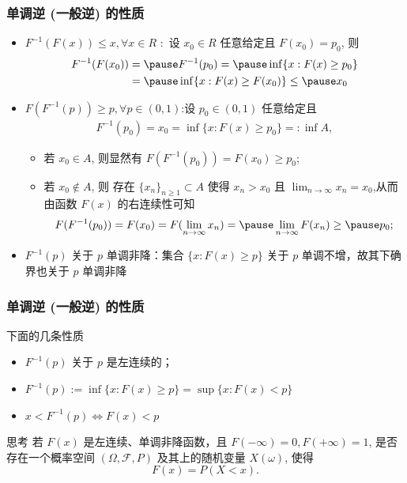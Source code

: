 


 \begin{frame}
	 \frametitle{单调逆 (一般逆) 的性质}

	 \begin{itemize}[<+-|alert@+>]
		 \item $F^{-1}(F (x))\leq x, \forall x\in R$ :\pause\  设 $x_0\in R$ 任意给定且 $F (x_0)=p_0$, 则 \pause
		 \begin{align*}
		  F^{-1}(F(x_0))&=\pause F^{-1}(p_0)=\pause \inf\{x: F(x)\geq p_0\}\\
		  &=\pause \inf\{x: F(x)\geq F(x_0)\}\leq\pause  x_0
		 \end{align*}
		 \item $F (F^{-1}(p))\geq p, \forall p\in (0,1)$:\pause 设 $p_0\in (0,1)$ 任意给定且
		 \begin{align*}
		 F^{-1}(p_0)=x_0=\inf\{x: F(x)\geq p_0\}=:\inf A, %
		 \end{align*}
	 \begin{itemize}[<+-|alert@+>]
		 \item 若 $x_0\in A$, 则显然有 $F (F^{-1}(p_0))=F (x_0)\geq p_0$;
		 \item 若 $x_0\notin A$, 则 \pause 存在 $\{x_n\}_{n\geq 1}\subset A$ 使得 $x_n>x_0$ 且 $\lim_{n\rightarrow \infty} x_n=x_0$,\pause  从而由函数 $F (x)$ 的右连续性可知 \pause
		 \[F(F^{-1}(p_0))=F(x_0)=F(\lim_{n\rightarrow \infty}x_n)=\pause \lim_{n\rightarrow \infty}F(x_n)\geq\pause p_0;\]
	 \end{itemize}
	 \item $F^{-1}(p)$ 关于 $p$ 单调非降：集合 $\{x:F (x)\geq p\}$ 关于 $p$ 单调不增，故其下确界也关于 $p$ 单调非降
		 \end{itemize}
	 \end{frame}

 \begin{frame}
	 \frametitle{单调逆 (一般逆) 的性质}
	 下面的几条性质 %
	 \begin{itemize}[<+-|alert@+>]
		 \item  $F^{-1}(p)$ 关于 $p$ 是左连续的；
		 \item $F^{-1}(p):=\inf\{x: F(x)\geq p\}=\sup\{x:F(x)<p\}$
		 \item $x<F^{-1}(p)\Leftrightarrow F(x)<p$
	 \end{itemize}

 \end{frame}

 \begin{frame}{思考}
	 若 $F (x)$ 是左连续、单调非降函数，且 $F (-\infty)=0, F (+\infty)=1$, 是否存在一个概率空间 $(\Omega,\mathcal{F},P)$ 及其上的随机变量 $X (\omega)$, 使得
	 \[F(x)=P(X<x).\]



 \end{frame}
